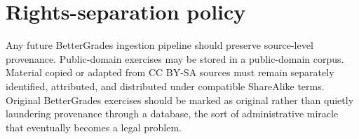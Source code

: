\section*{Rights-separation policy}

Any future BetterGrades ingestion pipeline should preserve source-level provenance. Public-domain exercises may be stored in a public-domain corpus. Material copied or adapted from CC BY-SA sources must remain separately identified, attributed, and distributed under compatible ShareAlike terms. Original BetterGrades exercises should be marked as original rather than quietly laundering provenance through a database, the sort of administrative miracle that eventually becomes a legal problem.
